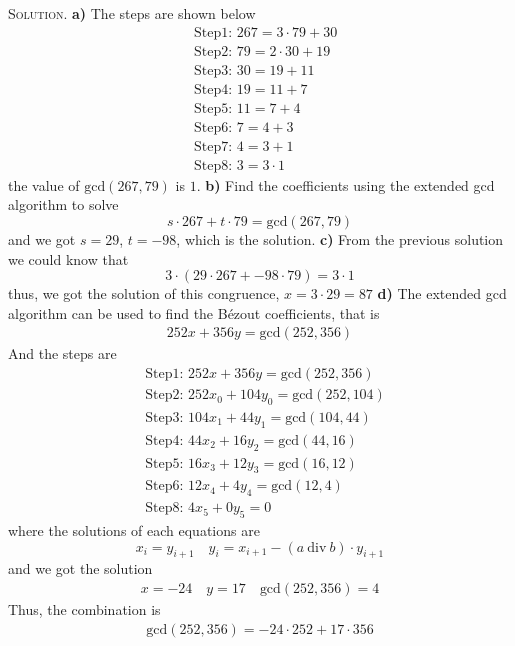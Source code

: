 \documentclass[12pt, a4paper, oneside]{article}
\newenvironment{solution}{\par\noindent\textsc{Solution. }}{\\\par}
\begin{document}
\begin{solution}
    \textbf{a)} The steps are shown below
    \begin{align*}
        &\text{Step1: } 267 = 3\cdot 79 + 30 \\
        &\text{Step2: } 79 = 2\cdot 30 + 19 \\
        &\text{Step3: } 30 = 19 + 11 \\
        &\text{Step4: } 19 = 11 + 7 \\
        &\text{Step5: } 11 = 7 + 4 \\
        &\text{Step6: } 7 = 4 + 3 \\
        &\text{Step7: } 4 = 3 + 1 \\
        &\text{Step8: } 3 = 3\cdot 1
    \end{align*}
    the value of $\text{gcd}(267,79)$ is $1$.
    \newline\textbf{b)} Find the coefficients using the extended gcd algorithm to solve
    \begin{equation*}
        s\cdot 267 + t\cdot 79 = \text{gcd}(267,79)
    \end{equation*}
    and we got $s = 29$, $t = -98$, which is the solution.
    \newline\textbf{c)} From the previous solution we could know that
    \begin{equation*}
        3\cdot (29\cdot 267 + -98\cdot 79) = 3\cdot 1
    \end{equation*}
    thus, we got the solution of this congruence, $x = 3\cdot 29 = 87$
    \newline\textbf{d)} The extended gcd algorithm can be used to find the B\'{e}zout coefficients, that is
    \begin{align*}
        252x + 356y = \text{gcd}(252,356)
    \end{align*}
    And the steps are
    \begin{align*}
        &\text{Step1: } 252x + 356y = \text{gcd}(252,356) \\
        &\text{Step2: } 252x_0 + 104y_0 = \text{gcd}(252,104) \\
        &\text{Step3: } 104x_1 + 44y_1 = \text{gcd}(104,44) \\
        &\text{Step4: } 44x_2 + 16y_2 = \text{gcd}(44,16) \\
        &\text{Step5: } 16x_3 + 12y_3 = \text{gcd}(16,12)\\
        &\text{Step6: } 12x_4 + 4y_4 = \text{gcd}(12,4) \\
        &\text{Step8: } 4x_5 + 0y_5 = 0
    \end{align*}
    where the solutions of each equations are
    \[x_i = y_{i+1}\quad y_i = x_{i+1} - (a\ \text{div}\ b)\cdot y_{i+1}\]
    and we got the solution
    \begin{align*}
        x = -24 \quad y = 17\quad \text{gcd}(252,356) = 4
    \end{align*}
    Thus, the combination is
    \begin{align*}
        \text{gcd}(252,356) = -24\cdot 252 + 17\cdot 356
    \end{align*}
\end{solution}
\end{document}
